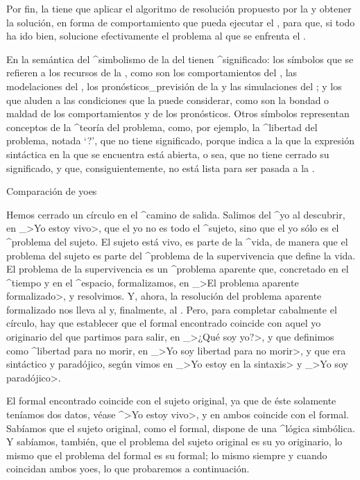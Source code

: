 Por fin, la {\mente} tiene que aplicar el algoritmo de resolución
propuesto por la {\razon} y obtener la solución, en forma de
comportamiento que pueda ejecutar el {\cuerpo}, para que, si todo ha ido
bien, solucione efectivamente el problema al que se enfrenta el
{\sujeto}.

En la semántica del ^{simbolismo} de la {\razon} del {\sujeto} tienen
^{significado}: los símbolos que se refieren a los recursos de la
{\mente}, como son los comportamientos del {\cuerpo}, las modelaciones
del {\modelador}, los pronósticos_{previsión} de la {\realidad} y las
simulaciones del {\simulador}; y los que aluden a las condiciones que la
{\razon} puede considerar, como son la bondad o maldad de los
comportamientos y de los pronósticos. Otros símbolos representan
conceptos de la ^{teoría del problema}, como, por ejemplo, la
^{libertad} del problema, notada `?', que no tiene significado, porque
indica a la {\razon} que la expresión sintáctica en la que se encuentra
está abierta, o sea, que no tiene cerrado su significado, y que,
consiguientemente, no está lista para ser pasada a la {\mente}.


\Section Comparación de yoes

Hemos cerrado un círculo en el ^{camino de salida}. Salimos del ^{yo} al
descubrir, en _>Yo estoy vivo>, que el yo no es todo el ^{sujeto}, sino
que el yo sólo es el ^{problema del sujeto}. El sujeto está vivo, es
parte de la ^{vida}, de manera que el problema del sujeto es parte del
^{problema de la supervivencia} que define la vida. El problema de la
supervivencia es un ^{problema aparente} que, concretado en el ^{tiempo}
y en el ^{espacio}, formalizamos, en _>El problema aparente
formalizado>, y resolvimos. Y, ahora, la resolución del problema
aparente formalizado nos lleva al {\sujeto} y, finalmente, al {\yo}.
Pero, para completar cabalmente el círculo, hay que establecer que el
{\yo} formal encontrado coincide con aquel yo originario del que
partimos para salir, en _>¿Qué soy yo?>, y que definimos como
^{libertad} para no morir, en _>Yo soy libertad para no morir>, y que
era sintáctico y paradójico, según vimos en _>Yo estoy en la sintaxis> y
_>Yo soy paradójico>.

El {\sujeto} formal encontrado coincide con el sujeto original, ya que
de éste solamente teníamos dos datos, véase ^>Yo estoy vivo>, y en ambos
coincide con el formal. Sabíamos que el sujeto original, como el
{\sujeto} formal, dispone de una ^{lógica simbólica}. Y sabíamos,
también, que el problema del sujeto original es su yo originario, lo
mismo que el problema del {\sujeto} formal es su {\yo} formal; lo mismo
siempre y cuando coincidan ambos yoes, lo que probaremos a continuación.

